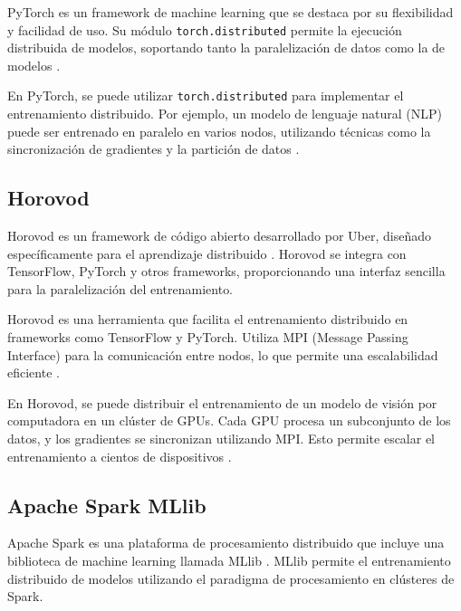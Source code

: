 \begin{definition}[PyTorch]
	PyTorch es un framework de machine learning que se destaca por su flexibilidad y facilidad de uso. Su módulo \texttt{torch.distributed} permite la ejecución distribuida de modelos, soportando tanto la paralelización de datos como la de modelos \cite{pytorch_api}.
\end{definition}

\begin{example}
	En PyTorch, se puede utilizar \texttt{torch.distributed} para implementar el entrenamiento distribuido. Por ejemplo, un modelo de lenguaje natural (NLP) puede ser entrenado en paralelo en varios nodos, utilizando técnicas como la sincronización de gradientes y la partición de datos \cite{pytorch_example}.
\end{example}

\subsection{Horovod}
Horovod es un framework de código abierto desarrollado por Uber, diseñado específicamente para el aprendizaje distribuido \cite{sergeev2018horovod}. Horovod se integra con TensorFlow, PyTorch y otros frameworks, proporcionando una interfaz sencilla para la paralelización del entrenamiento.

\begin{definition}[Horovod]
	Horovod es una herramienta que facilita el entrenamiento distribuido en frameworks como TensorFlow y PyTorch. Utiliza MPI (Message Passing Interface) para la comunicación entre nodos, lo que permite una escalabilidad eficiente \cite{horovod_api}.
\end{definition}

\begin{example}
	En Horovod, se puede distribuir el entrenamiento de un modelo de visión por computadora en un clúster de GPUs. Cada GPU procesa un subconjunto de los datos, y los gradientes se sincronizan utilizando MPI. Esto permite escalar el entrenamiento a cientos de dispositivos \cite{horovod_example}.
\end{example}

\subsection{Apache Spark MLlib}
Apache Spark es una plataforma de procesamiento distribuido que incluye una biblioteca de machine learning llamada MLlib \cite{zaharia2016spark}. MLlib permite el entrenamiento distribuido de modelos utilizando el paradigma de procesamiento en clústeres de Spark.

